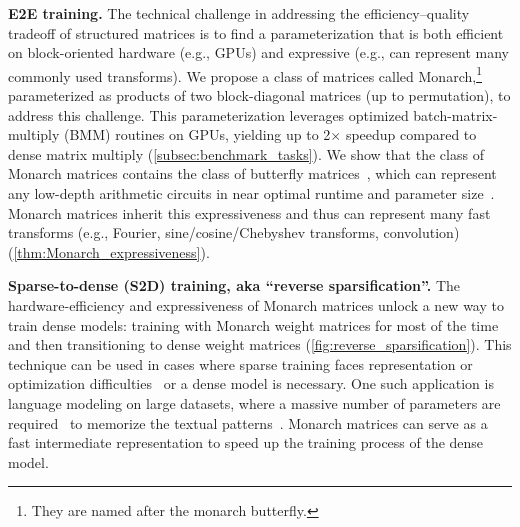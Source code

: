 \textbf{E2E training.} The technical challenge in addressing the efficiency--quality tradeoff of structured matrices is to find a parameterization that is both efficient on block-oriented hardware (e.g., GPUs) and expressive (e.g., can represent many commonly used transforms). We propose a class of matrices called Monarch,\footnote{They are named after the monarch butterfly.} parameterized as products of two block-diagonal matrices (up to permutation), to address this challenge. This parameterization leverages optimized batch-matrix-multiply (BMM) routines on GPUs, yielding up to 2$\times$ speedup compared to dense matrix multiply (\ref{subsec:benchmark_tasks}).
We show that the class of Monarch matrices contains the class of butterfly matrices~\citep{parker1995random,dao2019learning}, which can represent any low-depth arithmetic circuits in near optimal runtime and parameter size~\citep{dao2020kaleidoscope}. Monarch matrices inherit this expressiveness and thus can represent many fast transforms (e.g., Fourier, sine/cosine/Chebyshev transforms, convolution) (\ref{thm:Monarch_expressiveness}).

\textbf{Sparse-to-dense (S2D) training, aka ``reverse sparsification''.} The hardware-efficiency and expressiveness of Monarch matrices unlock a new way to train dense models: training with Monarch weight matrices for most of the time and then transitioning to dense weight matrices (\ref{fig:reverse_sparsification}).
This technique can be used in cases where sparse training faces representation or optimization difficulties~\citep{evci2019difficulty} or a dense model is necessary. One such application is language modeling on large datasets, where a massive number of parameters are required~\citep{kaplan2020scaling} to memorize the textual patterns~\citep{geva2020transformer}. Monarch matrices can serve as a fast intermediate representation to speed up the training process of the dense model.

